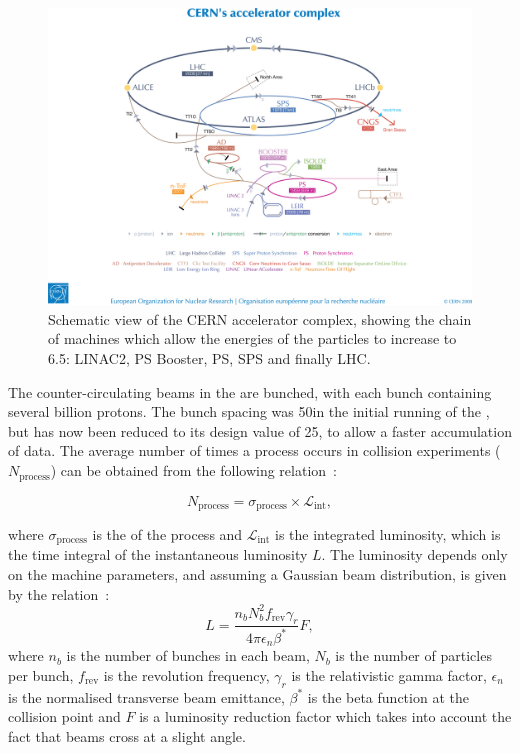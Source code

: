 \begin{figure}[h]
\centering
\includegraphics[width=1.0\textwidth]{detectorFigures/accelerators.jpg}
\caption{Schematic view of the CERN accelerator complex, showing the chain of machines which allow the energies of the particles to increase to 6.5\TeV: LINAC2, PS Booster, PS, SPS and finally LHC.~~\cite{Christiane:1260465}}
\label{fig:accelerators}
\end{figure}

The counter-circulating beams in the \LHC are bunched, with each bunch containing several billion protons. The bunch spacing was 50\ns in the initial running of the \LHC, but has now been reduced to its design value of 25\ns, to allow a faster accumulation of data. The average number of times a process occurs in collision experiments ($N_{\text{process}}$) can be obtained from the following relation~\cite{Benedikt:823808}:

\begin{equation}
\label{eq:NeqSigmaL}
N_{\text{process}} = \sigma_{\text{process}}\times \mathcal{L}_{\text{int}},
\end{equation}

where $\sigma_{\text{process}}$ is the \crosssection of the process and $\mathcal{L}_{\text{int}}$ is the integrated luminosity, which is the time integral of the instantaneous luminosity $L$. The luminosity depends only on the machine parameters, and assuming a Gaussian beam distribution, is given by the relation~\cite{Benedikt:823808}:
\begin{equation}
\label{eq:NeqSigmaL}
L = \frac{n_{b} N^{2}_{b} f_{\text{rev}} \gamma_{r}}{4 \pi \epsilon_{n} \beta^{*}} F,
\end{equation}
where $n_{b}$ is the number of bunches in each beam, $N_{b}$ is the number of particles per bunch, $f_{\text{rev}}$ is the revolution frequency, $\gamma_{r}$ is the relativistic gamma factor, $\epsilon_{n}$ is the normalised transverse beam emittance, $\beta^{*}$ is the beta function at the collision point and $F$ is a luminosity reduction factor which takes into account the fact that beams cross at a slight angle. 

